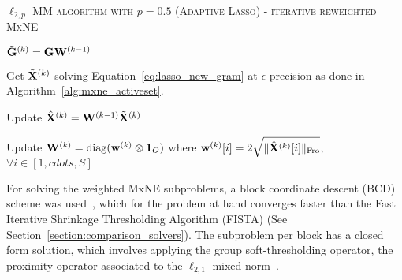 {\fontsize{4}{4}\selectfont
\begin{algorithm}[t]
\caption{\textsc{$\ell_{2,p}$ MM algorithm with $p=0.5$ (Adaptive Lasso) - iterative reweighted MxNE}}
    {
		$\tilde{\mathbf{G}}^{(k)} = \mathbf{G} \mathbf{W}^{(k-1)}$

		Get $\tilde{\mathbf{X}}^{(k)}$ solving Equation~\eqref{eq:lasso_new_gram} at $\epsilon$-precision as done in Algorithm~\ref{alg:mxne_activeset}.

		Update $\hat{\mathbf{X}}^{(k)} = \mathbf{W}^{(k-1)} \tilde{\mathbf{X}}^{(k)}$

	    Update $\mathbf{W}^{(k)}=\mathrm{diag}(\mathbf{w}^{(k)} \otimes \mathbf{1}_{O})$ where $\mathbf{w}^{(k)}[i] = 2 \sqrt{\|{\hat{\mathbf{X}}^{(k)}[i]}\|_{\rm Fro}}$,  $\forall i\in [1, cdots, S]$


     }
\label{alg:adpative_lasso}
\end{algorithm}
}

For solving the weighted MxNE subproblems, a block coordinate descent (BCD) scheme was used~\cite{tseng}, which for the problem at hand converges faster than the Fast Iterative Shrinkage Thresholding Algorithm (FISTA) (See Section~\ref{section:comparison_solvers}). The subproblem per block has a closed form solution, which involves applying the group soft-thresholding operator, the proximity operator associated to the $\ell_{2,1}$-mixed-norm~\cite{gramfort2012mixed,strohmeier-etal:16}.

